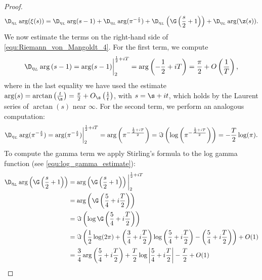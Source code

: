 \begin{proof}
        \begin{equation}\label{equ:Riemann_von_Mangoldt_4}
          \D_{\eta_{L}}\arg(\xi(s)) = \D_{\eta_{L}}\arg(s-1)+\D_{\eta_{L}}\arg(\pi^{-\frac{s}{2}})+\D_{\eta_{L}}\left(\G\left(\frac{s}{2}+1\right)\right)+\D_{\eta_{L}}\arg(\z(s)).
        \end{equation}
        We now estimate the terms on the right-hand side of \cref{equ:Riemann_von_Mangoldt_4}. For the first term, we compute
        \begin{equation}\label{equ:Riemann_von_Mangoldt_5}
          \D_{\eta_{L}}\arg\left(s-1\right) = \arg(s-1)\bigg|_{2}^{\frac{1}{2}+iT} = \arg\left(-\frac{1}{2}+iT\right) = \frac{\pi}{2}+O\left(\frac{1}{T}\right),
        \end{equation}
        where in the last equality we have used the estimate $\arg(s) = \arctan\left(\frac{t}{\s}\right) = \frac{\pi}{2}+O_{\s}\left(\frac{1}{t}\right)$, with $s = \s+it$, which holds by the Laurent series of $\arctan(s)$ near $\infty$. For the second term, we perform an analogous computation:
        \begin{equation}\label{equ:Riemann_von_Mangoldt_6}
          \D_{\eta_{L}}\arg(\pi^{-\frac{s}{2}}) = \arg(\pi^{-\frac{s}{2}})\bigg|_{2}^{\frac{1}{2}+iT} = \arg\left(\pi^{-\frac{\frac{1}{2}+iT}{2}}\right) = \Im\left(\log\left(\pi^{-\frac{\frac{1}{2}+iT}{2}}\right)\right) = -\frac{T}{2}\log(\pi).
        \end{equation}
        To compute the gamma term we apply Stirling's formula to the log gamma function (see \cref{equ:log_gamma_estimate}):
        \begin{equation}\label{equ:Riemann_von_Mangoldt_7}
          \begin{aligned}
            \D_{\eta_{L}}\arg\left(\G\left(\frac{s}{2}+1\right)\right) &= \arg\left(\G\left(\frac{s}{2}+1\right)\right)\bigg|_{2}^{\frac{1}{2}+iT} \\
            &= \arg\left(\G\left(\frac{5}{4}+i\frac{T}{2}\right)\right) \\
            &= \Im\left(\log\G\left(\frac{5}{4}+i\frac{T}{2}\right)\right) \\
            &= \Im\left(\frac{1}{2}\log(2\pi)+\left(\frac{3}{4}+i\frac{T}{2}\right)\log\left(\frac{5}{4}+i\frac{T}{2}\right)-\left(\frac{5}{4}+i\frac{T}{2}\right)\right)+O(1) \\
            &= \frac{3}{4}\arg\left(\frac{5}{4}+i\frac{T}{2}\right)+\frac{T}{2}\log\left|\frac{5}{4}+i\frac{T}{2}\right|-\frac{T}{2}+O(1) \\

\end{aligned}
\end{equation}
\end{proof}
